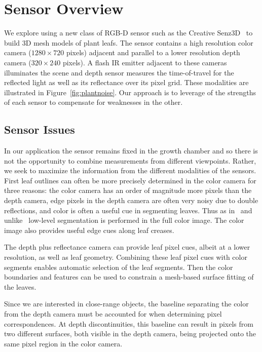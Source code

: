 \section{Sensor Overview}
\label{sec:overview}

We explore using a new class of RGB-D sensor such as the Creative Senz3D~\cite{nguyen2015vietnamese} to build 3D mesh models of plant leafs. The sensor contains a high resolution color camera ($1280 \times 720$ pixels) adjacent and parallel to a lower resolution depth camera ($320\times240$ pixels).  A flash IR emitter adjacent to these cameras illuminates the scene and depth sensor measures the time-of-travel for the reflected light as well as its reflectance over its pixel grid.  These modalities are illustrated in Figure~\ref{fig:plantnoise}.  Our approach is to leverage of the strengths of each sensor to compensate for weaknesses in the other.  

\subsection{Sensor Issues}

In our application the sensor remains fixed in the growth chamber and so there is not the opportunity to combine measurements from different viewpoints.  Rather, we seek to maximize the information from the different modalities of the sensors.  First leaf outlines can often be more precisely determined in the color camera for three reasons: the color camera has an order of magnitude more pixels than the depth camera, edge pixels in the depth camera are often very noisy due to double reflections, and color is often a useful cue in segmenting leaves.  Thus as in~\cite{Dellen2011} and unlike~\cite{Alenya2011,Alenya2013} low-level segmentation is performed in the full color image.  The color image also provides useful edge cues along leaf creases.

The depth plus reflectance camera can provide leaf pixel cues, albeit at a lower resolution, as well as leaf geometry. Combining these leaf pixel cues with color segments enables automatic selection of the leaf segments.  Then the color boundaries and features can be used to constrain a mesh-based surface fitting of the leaves.

Since we are interested in close-range objects, the baseline separating the color from the depth camera must be accounted for when determining pixel correspondences.  At depth discontinuities, this baseline can result in pixels from two different surfaces, both visible in the depth camera, being projected onto the same pixel region in the color camera.  

